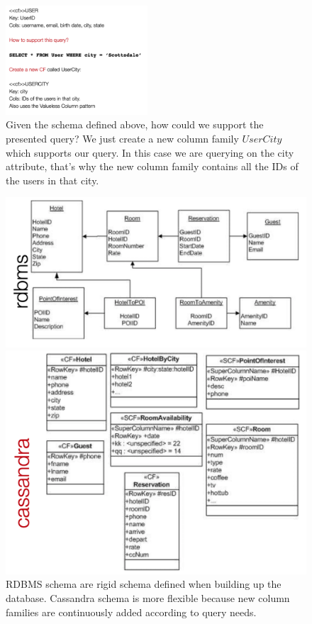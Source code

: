 \documentclass[10pt,a4paper]{article}
\begin{document}
\begin{figure}[ht!]
 \hfill \includegraphics[width=150pt]{images/cassandra-index.png}\hspace*{\fill}
  \caption{Given the schema defined above, how could we support the presented query? We just create a new column family $UserCity$ which supports our query. In this case we are querying on the city attribute, that's why the new column family contains all the IDs of the users in that city.}
\end{figure}
 
\begin{figure}[ht!]
\centering
\begin{minipage}{.5\textwidth}
  \centering
  \includegraphics[width=.8\linewidth]{images/rdbms-schema}
\end{minipage}%
\begin{minipage}{.5\textwidth}
  \centering
  \includegraphics[width=.8\linewidth]{images/cassandra-schema}
\end{minipage}
\caption{RDBMS schema are rigid schema defined when building up the database. Cassandra schema is more flexible because new column families are continuously added according to query needs. }
\end{figure} 
 
\end{document}
